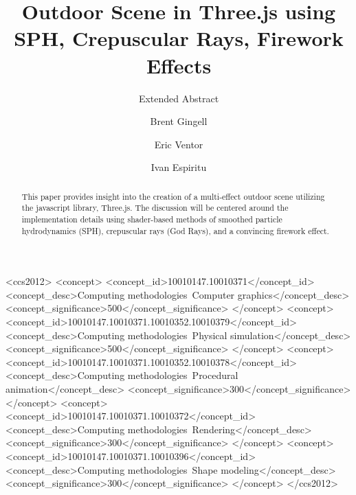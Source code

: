 \documentclass[sigconf]{acmart}
\begin{document}
\title{Outdoor Scene in Three.js using SPH, Crepuscular Rays, Firework Effects}
\subtitle{Extended Abstract}


\author{Brent Gingell}

\author{Eric Ventor}

\author{Ivan Espiritu}


\begin{abstract}
This paper provides insight into the creation of a multi-effect outdoor scene 
utilizing the javascript library, Three.js. The discussion will be centered around the implementation details using shader-based methods of
smoothed particle hydrodynamics (SPH), crepuscular rays (God Rays), and a convincing firework effect.
\end{abstract}

%
%
\begin{CCSXML}
<ccs2012>
<concept>
<concept_id>10010147.10010371</concept_id>
<concept_desc>Computing methodologies~Computer graphics</concept_desc>
<concept_significance>500</concept_significance>
</concept>
<concept>
<concept_id>10010147.10010371.10010352.10010379</concept_id>
<concept_desc>Computing methodologies~Physical simulation</concept_desc>
<concept_significance>500</concept_significance>
</concept>
<concept>
<concept_id>10010147.10010371.10010352.10010378</concept_id>
<concept_desc>Computing methodologies~Procedural animation</concept_desc>
<concept_significance>300</concept_significance>
</concept>
<concept>
<concept_id>10010147.10010371.10010372</concept_id>
<concept_desc>Computing methodologies~Rendering</concept_desc>
<concept_significance>300</concept_significance>
</concept>
<concept>
<concept_id>10010147.10010371.10010396</concept_id>
<concept_desc>Computing methodologies~Shape modeling</concept_desc>
<concept_significance>300</concept_significance>
</concept>
</ccs2012>
\end{CCSXML}
\end{document}
